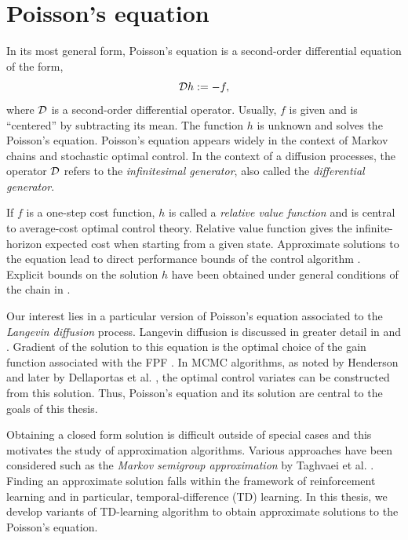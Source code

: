 \section{Poisson's equation} 
\label{poissons_eq}
In its most general form, Poisson's equation is a second-order differential equation of the form,
\begin{equation*}
{\cal D} h := - f,
\end{equation*}
where ${\cal D}$ is a second-order differential operator. Usually, $f$ is given and is ``centered'' by subtracting its mean. The function $h$ is unknown and solves the Poisson's equation. Poisson's equation appears widely in the context of Markov chains and stochastic optimal control. In the context of a diffusion processes, the operator ${\cal D}$ refers to the \textit{infinitesimal generator}, also called the \textit{differential generator}. 

If $f$ is a one-step cost function, $h$ is called a \textit{relative value function} and is central to average-cost optimal control theory.  Relative value function gives the infinite-horizon expected cost when starting from a given state. Approximate solutions to the equation lead to direct performance bounds of the control algorithm \cite{ctcn}. Explicit bounds on the solution $h$ have been obtained under general conditions of the chain in \cite{}.

Our interest lies in a particular version of Poisson's equation associated to the \textit{Langevin diffusion} process. Langevin diffusion is discussed in greater detail in  and . Gradient of the solution to this equation is the optimal choice of the gain function associated with the FPF \cite{yanmehmey13}. In MCMC algorithms, as noted by Henderson \cite{henthesis97} and later by Dellaportas et al. \cite{delkon12}, the optimal control variates can be constructed from this solution. Thus, Poisson's equation and its solution are central to the goals of this thesis. 

Obtaining a closed form solution is difficult outside of special cases and this motivates the study of approximation algorithms. Various approaches have been considered such as the \textit{Markov semigroup approximation} by Taghvaei et al. \cite{tagmeh16a}. Finding an approximate solution falls within the framework of reinforcement learning and in particular, temporal-difference (TD) learning. In this thesis, we develop variants of TD-learning algorithm to obtain approximate solutions to the Poisson's equation.

